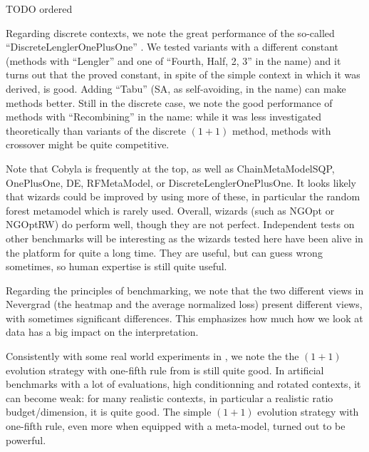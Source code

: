 
TODO ordered



Regarding discrete contexts, we note the great performance of the so-called ``DiscreteLenglerOnePlusOne''
\cite{lengler}. We tested variants with a different constant (methods with ``Lengler'' and one of ``Fourth, Half, 2, 3''
in the name) and it turns out that the proved constant, in spite of the simple context in which it was derived, is good.
Adding ``Tabu'' (SA, as self-avoiding, in the name) can make methods better.
Still in the discrete case, we note the good performance of methods with ``Recombining'' in the name: while it was less
investigated theoretically than variants of the discrete $(1+1)$ method, methods with crossover might be quite
competitive.

Note that Cobyla is frequently at the top, as well as ChainMetaModelSQP, OnePlusOne, DE, RFMetaModel, or DiscreteLenglerOnePlusOne.
It looks likely that wizards could be improved by using more of these, in particular the random forest metamodel which
is rarely used.
Overall, wizards (such as NGOpt or NGOptRW) do perform well, though they are not perfect. Independent tests on other
benchmarks will be interesting as the wizards tested here have been alive in the platform for quite a long time. They
are useful, but can guess wrong sometimes, so human expertise is still quite useful.

Regarding the principles of benchmarking, we note that the two different views in Nevergrad (the heatmap and the average
normalized loss) present different views, with sometimes significant differences. This emphasizes how much how we look at data has a big impact on the interpretation.

%
%
%
%

Consistently with some real world experiments in \cite{micropredictions1,micropredictions2}, we note the the $(1+1)$ evolution strategy with one-fifth rule from \cite{rechenberg73} is still quite good. In artificial benchmarks with a lot of evaluations, high conditionning and rotated contexts, it can become weak: for many realistic contexts, in particular a realistic ratio budget/dimension, it is quite good.
The simple $(1+1)$ evolution strategy with one-fifth rule, even more when equipped with a meta-model, turned out to be powerful.


